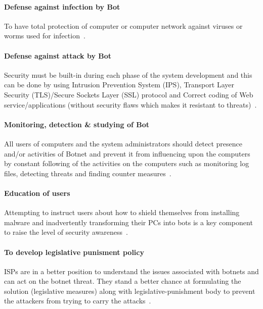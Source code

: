 


\paragraph{Defense against infection by Bot}
To have total protection of computer or computer network against viruses or worms used for infection~\cite{stankovic2009defense}.


\paragraph{Defense against attack by Bot}
Security must be built-in during each phase of the system development and this can be done by using Intrusion Prevention System (IPS), Transport Layer Security (TLS)/Secure Sockets Layer (SSL) protocol and Correct coding of Web service/applications (without security flaws which makes it resistant to threats)~\cite{stankovic2009defense}.


\paragraph{Monitoring, detection & studying of Bot}
All users of computers and the system administrators should detect presence and/or activities of Botnet and prevent it from influencing upon the computers by constant following of the activities on the computers such as monitoring log files, detecting threats and finding counter measures~\cite{stankovic2009defense}.


\paragraph{Education of users}
Attempting to instruct users about how to shield themselves from installing malware and inadvertently transforming their PCs into bots is a key component to raise the level of security awareness~\cite{stankovic2009defense}.


\paragraph{To develop legislative punisment policy}
ISPs are in a better position to understand the issues associated with botnets and can act on the botnet threat. They stand a better chance at formulating the solution (legislative measures) along with legislative-punishment body to prevent the attackers from trying to carry the attacks~\cite{stankovic2009defense}.


